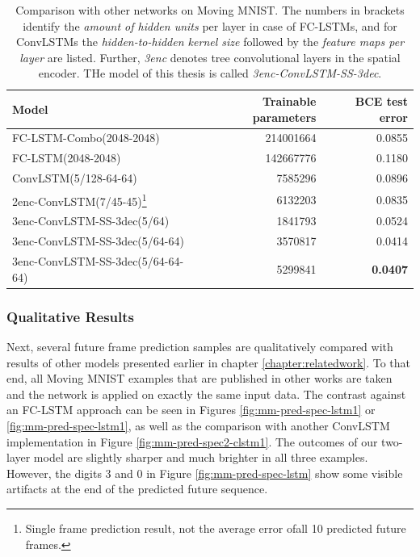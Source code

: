 \begin{table}[htb]
  \small
  \centering
  \begin{tabular}{l r r}
    \toprule
      \textbf{Model} & \textbf{Trainable parameters} & \textbf{BCE test error} \\
    \midrule
      FC-LSTM-Combo(2048-2048) \tiny{\parencite{unsup_learn_lstm}} & \num{214001664} & 0.0855 \\
      FC-LSTM(2048-2048) \tiny{\parencite{conv_lstm_nowcasting}} & \num{142667776} & 0.1180 \\
      ConvLSTM(5/128-64-64) \tiny{\parencite{conv_lstm_nowcasting}} & \num{7585296} & 0.0896 \\
      2enc-ConvLSTM(7/45-45)\footnote{Single frame prediction result, not the average error ofall 10 predicted future frames.} \tiny{\parencite{spat_temp_video_autoenc}} & \num{6132203} & 0.0835 \\
    \midrule
      3enc-ConvLSTM-SS-3dec(5/64) & \num{1841793} & 0.0524 \\
      3enc-ConvLSTM-SS-3dec(5/64-64) & \num{3570817} & 0.0414 \\
      3enc-ConvLSTM-SS-3dec(5/64-64-64) & \num{5299841} & \textbf{0.0407} \\
    \bottomrule
  \end{tabular}
  \caption[Test Results on Moving MNIST]{Comparison with other networks on Moving MNIST. The numbers in brackets identify the \textit{amount of hidden units} per layer in case of FC-LSTMs, and for ConvLSTMs the \textit{hidden-to-hidden kernel size} followed by the \textit{feature maps per layer} are listed. Further, \textit{3enc} denotes tree convolutional layers in the spatial encoder. THe model of this thesis is called \textit{3enc-ConvLSTM-SS-3dec}.}\label{tab:mm-comparison}
\end{table}

\subsubsection{Qualitative Results}

Next, several future frame prediction samples are qualitatively compared with results of other models presented earlier in chapter \ref{chapter:relatedwork}. To that end, all Moving MNIST examples that are published in other works are taken and the network is applied on exactly the same input data. The contrast against an FC-LSTM approach can be seen in Figures \ref{fig:mm-pred-spec-lstm1} or \ref{fig:mm-pred-spec-lstm1}, as well as the comparison with another ConvLSTM implementation in Figure \ref{fig:mm-pred-spec2-clstm1}. The outcomes of our two-layer model are slightly sharper and much brighter in all three examples. However, the digits \num{3} and \num{0} in Figure \ref{fig:mm-pred-spec-lstm} show some visible artifacts at the end of the predicted future sequence.

